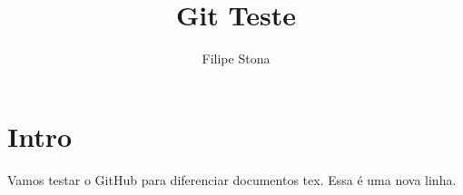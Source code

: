 \documentclass[]{article}
\title{Git Teste}
\author{Filipe Stona}
\begin{document}
\maketitle

\begin{abstract}

\end{abstract}

\section{Intro}
Vamos testar o GitHub para diferenciar documentos tex. Essa é uma nova linha.
\end{document}
